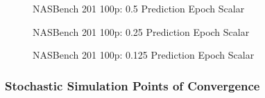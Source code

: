 \documentclass[twocolumn]{article}
\begin{document}
\begin{figure}[!h]
    \begin{center}
        \resizebox{0.95\columnwidth}{!}{
            
        }
        \caption{NASBench 201 100p: 0.5 Prediction Epoch Scalar}
        \label{fig:nasbench_100_2x_acceleration}
    \end{center}
\end{figure}

\begin{figure}[!h]
    \begin{center}
        \resizebox{0.95\columnwidth}{!}{
            
        }
        \caption{NASBench 201 100p: 0.25 Prediction Epoch Scalar}
        \label{fig:nasbench_100_4x_acceleration}
    \end{center}
\end{figure}

\begin{figure}[!h]
    \begin{center}
        \resizebox{0.95\columnwidth}{!}{
            
        }
        \caption{NASBench 201 100p: 0.125 Prediction Epoch Scalar}
        \label{fig:nasbench_100_8x_acceleration}
    \end{center}
\end{figure}


\clearpage
\FloatBarrier
\onecolumn
\subsubsection{Stochastic Simulation Points of Convergence}
\end{document}
